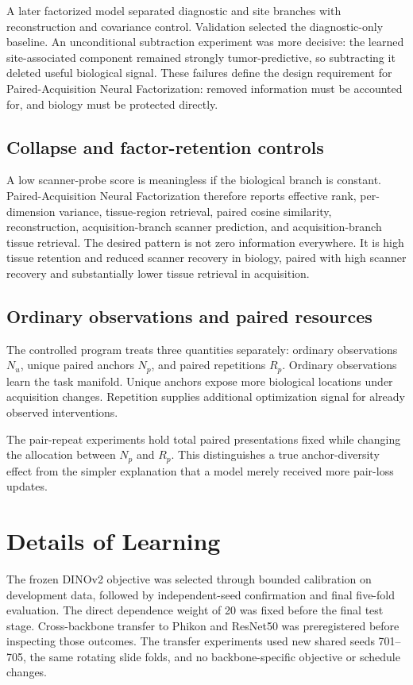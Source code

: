 \documentclass[10pt]{article}
\begin{document}
A later factorized model separated diagnostic and site branches with reconstruction and covariance control. Validation selected the diagnostic-only baseline. An unconditional subtraction experiment was more decisive: the learned site-associated component remained strongly tumor-predictive, so subtracting it deleted useful biological signal. These failures define the design requirement for Paired-Acquisition Neural Factorization: removed information must be accounted for, and biology must be protected directly.

\subsection{Collapse and factor-retention controls}
A low scanner-probe score is meaningless if the biological branch is constant. Paired-Acquisition Neural Factorization therefore reports effective rank, per-dimension variance, tissue-region retrieval, paired cosine similarity, reconstruction, acquisition-branch scanner prediction, and acquisition-branch tissue retrieval. The desired pattern is not zero information everywhere. It is high tissue retention and reduced scanner recovery in biology, paired with high scanner recovery and substantially lower tissue retrieval in acquisition.

\subsection{Ordinary observations and paired resources}
The controlled program treats three quantities separately: ordinary observations $N_u$, unique paired anchors $N_p$, and paired repetitions $R_p$. Ordinary observations learn the task manifold. Unique anchors expose more biological locations under acquisition changes. Repetition supplies additional optimization signal for already observed interventions.

The pair-repeat experiments hold total paired presentations fixed while changing the allocation between $N_p$ and $R_p$. This distinguishes a true anchor-diversity effect from the simpler explanation that a model merely received more pair-loss updates.

\section{Details of Learning}
The frozen DINOv2 objective was selected through bounded calibration on development data, followed by independent-seed confirmation and final five-fold evaluation. The direct dependence weight of 20 was fixed before the final test stage. Cross-backbone transfer to Phikon and ResNet50 was preregistered before inspecting those outcomes. The transfer experiments used new shared seeds 701--705, the same rotating slide folds, and no backbone-specific objective or schedule changes.
\end{document}
